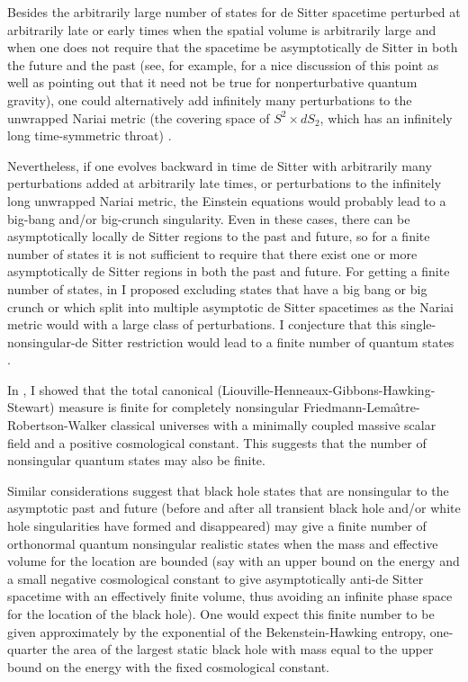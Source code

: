 \documentclass[12pt]{article}
\begin{document}
Besides the arbitrarily large number of states for de Sitter spacetime perturbed at arbitrarily late or early times when the spatial volume is arbitrarily large and when one does not require that the spacetime be asymptotically de Sitter in both the future and the past (see, for example, \cite{Witten:2001kn} for a nice discussion of this point as well as pointing out that it need not be true for nonperturbative quantum gravity), one could alternatively add infinitely many perturbations to the unwrapped Nariai metric (the covering space of $S^2\times dS_2$, which has an infinitely long time-symmetric throat) \cite{Page:2007hp, Page:2009ct}.

Nevertheless, if one evolves backward in time de Sitter with arbitrarily many perturbations added at arbitrarily late times, or perturbations to the infinitely long unwrapped Nariai metric, the Einstein equations would probably lead to a big-bang and/or big-crunch singularity.  Even in these cases, there can be asymptotically locally de Sitter regions to the past and future, so for a finite number of states it is not sufficient to require that there exist one or more asymptotically de Sitter regions in both the past and future.  For getting a finite number of states, in \cite{Page:2007hp} I proposed excluding states that have a big bang or big crunch or which split into multiple asymptotic de Sitter spacetimes as the Nariai metric would with a large class of perturbations.  I conjecture that this single-nonsingular-de Sitter restriction would lead to a finite number of quantum states \cite{Page:2007hp, Page:2009ct}.

In \cite{Page:2011yd}, I showed that the total canonical (Liouville-Henneaux-Gibbons-Hawking-Stewart) measure is finite for completely nonsingular Friedmann-Lema\^{\i}tre-Robertson-Walker classical universes with a minimally coupled massive scalar field and a positive cosmological constant.  This suggests that the number of nonsingular quantum states may also be finite.

Similar considerations suggest that black hole states that are nonsingular to the asymptotic past and future (before and after all transient black hole and/or white hole singularities have formed and disappeared) may give a finite number of orthonormal quantum nonsingular realistic states when the mass and effective volume for the location are bounded (say with an upper bound on the energy and a small negative cosmological constant to give asymptotically anti-de Sitter spacetime with an effectively finite volume, thus avoiding an infinite phase space for the location of the black hole).  One would expect this finite number to be given approximately by the exponential of the Bekenstein-Hawking entropy, one-quarter the area of the largest static black hole with mass equal to the upper bound on the energy with the fixed cosmological constant.
\end{document}
